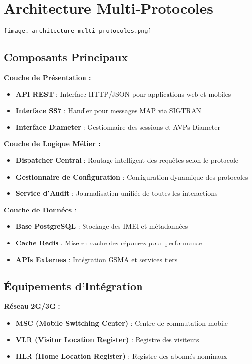 \documentclass[11pt]{article}
\begin{document}
\section{Architecture Multi-Protocoles}

\begin{center}
    \texttt{[image: architecture\_multi\_protocoles.png]} 
\end{center}

\subsection{Composants Principaux}

\textbf{Couche de Présentation :}
\begin{itemize}
    \item \textbf{API REST} : Interface HTTP/JSON pour applications web et mobiles
    \item \textbf{Interface SS7} : Handler pour messages MAP via SIGTRAN
    \item \textbf{Interface Diameter} : Gestionnaire des sessions et AVPs Diameter
\end{itemize}

\textbf{Couche de Logique Métier :}
\begin{itemize}
    \item \textbf{Dispatcher Central} : Routage intelligent des requêtes selon le protocole
    \item \textbf{Gestionnaire de Configuration} : Configuration dynamique des protocoles
    \item \textbf{Service d'Audit} : Journalisation unifiée de toutes les interactions
\end{itemize}

\textbf{Couche de Données :}
\begin{itemize}
    \item \textbf{Base PostgreSQL} : Stockage des IMEI et métadonnées
    \item \textbf{Cache Redis} : Mise en cache des réponses pour performance
    \item \textbf{APIs Externes} : Intégration GSMA et services tiers
\end{itemize}

\subsection{Équipements d'Intégration}

\textbf{Réseau 2G/3G :}
\begin{itemize}
    \item \textbf{MSC (Mobile Switching Center)} : Centre de commutation mobile
    \item \textbf{VLR (Visitor Location Register)} : Registre des visiteurs
    \item \textbf{HLR (Home Location Register)} : Registre des abonnés nominaux
\end{itemize}
\end{document}
